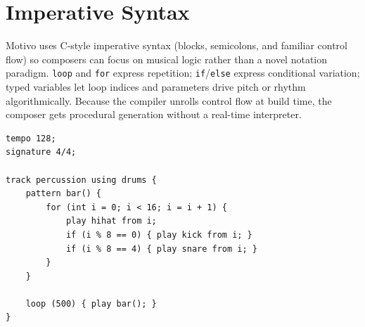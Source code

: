 \section{Imperative Syntax}\label{sec:syntax-design}

Motivo uses C-style imperative syntax (blocks, semicolons, and familiar control flow) so composers can focus on
musical logic rather than a novel notation paradigm.
\texttt{loop} and \texttt{for} express repetition; \texttt{if}/\texttt{else} express conditional variation; typed
variables let loop indices and parameters drive pitch or rhythm algorithmically.
Because the compiler unrolls control flow at build time, the composer gets procedural generation without a
real-time interpreter.

\begin{lstlisting}[language=Motivo, caption={A compact Motivo drum pattern.}, label={lst:motivo-groove}]
tempo 128;
signature 4/4;

track percussion using drums {
    pattern bar() {
        for (int i = 0; i < 16; i = i + 1) {
            play hihat from i;
            if (i % 8 == 0) { play kick from i; }
            if (i % 8 == 4) { play snare from i; }
        }
    }

    loop (500) { play bar(); }
}
\end{lstlisting}
